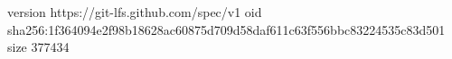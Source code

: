 version https://git-lfs.github.com/spec/v1
oid sha256:1f364094e2f98b18628ac60875d709d58daf611c63f556bbc83224535c83d501
size 377434
